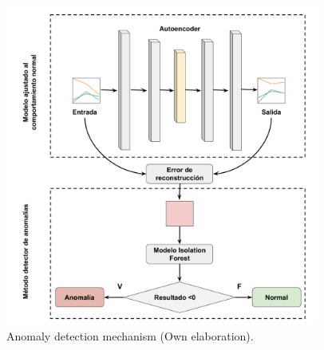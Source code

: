 \begin{figure}[H]
        \centering
            \includegraphics[width=0.92\textwidth, frame]{imagenes/Cap5/mecanismo}
        \caption{Anomaly detection mechanism (Own elaboration).}
		\label{fig:mecanismo}
\end{figure}


